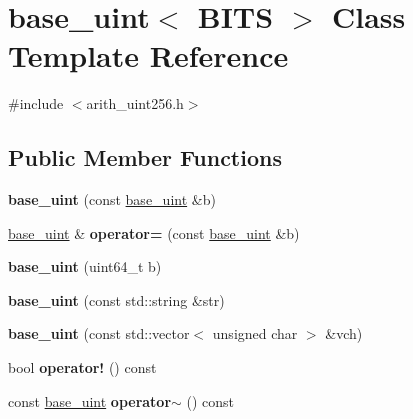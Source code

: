 \hypertarget{classbase__uint}{}\section{base\+\_\+uint$<$ B\+I\+TS $>$ Class Template Reference}
\label{classbase__uint}


{\ttfamily \#include $<$arith\+\_\+uint256.\+h$>$}

\subsection*{Public Member Functions}
\begin{DoxyCompactItemize}
\item 
\mbox{\label{classbase__uint_a5d4e4c28c82c3a12b3689860081579c1}} 
{\bfseries base\+\_\+uint} (const \mbox{\hyperlink{classbase__uint}{base\+\_\+uint}} \&b)
\item 
\mbox{\label{classbase__uint_a0425a3c4d342b6fc9a68b1766cee9ede}} 
\mbox{\hyperlink{classbase__uint}{base\+\_\+uint}} \& {\bfseries operator=} (const \mbox{\hyperlink{classbase__uint}{base\+\_\+uint}} \&b)
\item 
\mbox{\label{classbase__uint_a217f9750f0ca9cdeefffb7bb1f1952d6}} 
{\bfseries base\+\_\+uint} (uint64\+\_\+t b)
\item 
\mbox{\label{classbase__uint_aa1ebaba47302da3e120879d186355736}} 
{\bfseries base\+\_\+uint} (const std\+::string \&str)
\item 
\mbox{\label{classbase__uint_ab6dd7d7921572078a4733e4acc22b2a9}} 
{\bfseries base\+\_\+uint} (const std\+::vector$<$ unsigned char $>$ \&vch)
\item 
\mbox{\label{classbase__uint_afbcdb1cf849d37272b4e7d4fabf1192b}} 
bool {\bfseries operator!} () const
\item 
\mbox{\label{classbase__uint_a2803d039b33d5570f47ac39d797bc9ea}} 
const \mbox{\hyperlink{classbase__uint}{base\+\_\+uint}} {\bfseries operator$\sim$} () const
\item 
\mbox{\label{classbase__uint_a3b758876b828c6faffdc2a2880122595}} 

\end{DoxyCompactItemize}
